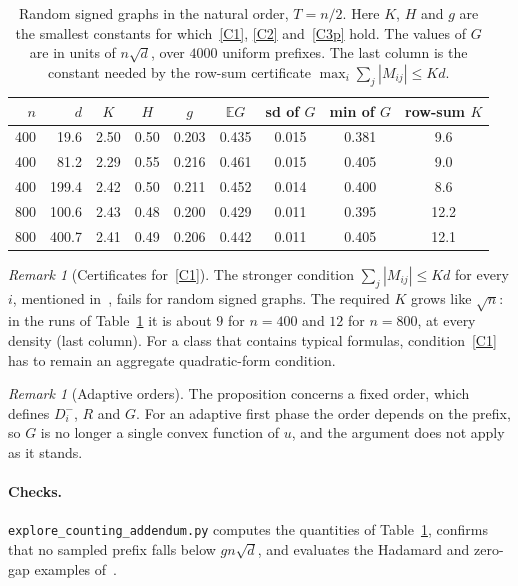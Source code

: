 \documentclass[11pt,a4paper]{article}
\theoremstyle{remark}
\newtheorem{remark}[theorem]{Remark}
\newcommand{\E}{\mathbb E}
\begin{document}
\begin{table}[ht]
\centering
\begin{tabular}{rrccccccc}
\toprule
$n$ & $d$ & $K$ & $H$ & $g$ & $\E G$ & sd of $G$ & min of $G$ & row-sum $K$\\
\midrule
400 & 19.6 & 2.50 & 0.50 & 0.203 & 0.435 & 0.015 & 0.381 & 9.6\\
400 & 81.2 & 2.29 & 0.55 & 0.216 & 0.461 & 0.015 & 0.405 & 9.0\\
400 & 199.4 & 2.42 & 0.50 & 0.211 & 0.452 & 0.014 & 0.400 & 8.6\\
800 & 100.6 & 2.43 & 0.48 & 0.200 & 0.429 & 0.011 & 0.395 & 12.2\\
800 & 400.7 & 2.41 & 0.49 & 0.206 & 0.442 & 0.011 & 0.405 & 12.1\\
\bottomrule
\end{tabular}
\caption{Random signed graphs in the natural order, $T=n/2$. Here $K$, $H$
and $g$ are the smallest constants for which~\eqref{C1}, \eqref{C2}
and~\eqref{C3p} hold. The values of $G$ are in units of $n\sqrt d$, over
$4000$ uniform prefixes. The last column is the constant needed by the
row-sum certificate $\max_i\sum_j|M_{ij}|\le Kd$.}\label{tab:random}
\end{table}

\begin{remark}[Certificates for~\eqref{C1}]
The stronger condition $\sum_j|M_{ij}|\le Kd$ for every $i$, mentioned
in~\cite{CC}, fails for random signed graphs. The required $K$ grows like
$\sqrt n$: in the runs of Table~\ref{tab:random} it is about $9$ for $n=400$
and $12$ for $n=800$, at every density (last column). For a class that contains typical formulas,
condition~\eqref{C1} has to remain an aggregate quadratic-form condition.
\end{remark}

\begin{remark}[Adaptive orders]
The proposition concerns a fixed order, which defines $D_i^-$, $R$ and $G$.
For an adaptive first phase the order depends on the prefix, so $G$ is no
longer a single convex function of $u$, and the argument does not apply as it
stands.
\end{remark}

\paragraph{Checks.} \texttt{explore\_counting\_addendum.py} computes the
quantities of Table~\ref{tab:random}, confirms that no sampled prefix falls
below $gn\sqrt d$, and evaluates the Hadamard and zero-gap examples of~\cite{CC}.
\end{document}
